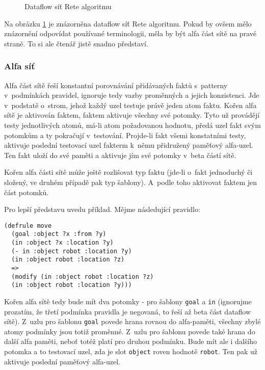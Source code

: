 \begin{figure}[h]
\centerline{}
\caption{Dataflow síť Rete algoritmu\cite{rete}}
\label{network}
\end{figure}

Na obrázku \ref{network} je znázorněna dataflow síť Rete algoritmu.
Pokud by ovšem mělo znázornění odpovídat používané terminologii, měla
by být alfa část sítě na pravé straně. To si ale čtenář jistě snadno
představí.
\subsubsection{Alfa síť}
Alfa část sítě řeší konstantní porovnávání přidávaných faktů s~patterny
v~podmínkách pravidel, ignoruje tedy vazby proměnných a jejich konzistenci.
Jde v~podstatě o~strom, jehož každý uzel testuje právě jeden atom faktu.
Kořen alfa sítě je aktivován faktem, faktem aktivuje všechny své potomky.
Tyto už provádějí testy jednotlivých atomů, má-li atom požadovanou hodnotu,
předá uzel fakt svým potomkům a ty pokračují v~testování. Projde-li fakt
všemi konstatními testy, aktivuje poslední testovací uzel fakterm k~němu
přidružený paměťový alfa-uzel. Ten fakt uloží do své paměti a aktivuje
jím své potomky v~beta částí sítě.

Kořen alfa části sítě může ještě rozlišovat typ faktu (jde-li o~fakt
jednoduchý či složený, ve druhém případě pak typ šablony). A~podle toho
aktivovat faktem jen část potomků.

Pro lepší představu uvedu příklad. Mějme následující pravidlo:
\begin{verbatim}
(defrule move
  (goal :object ?x :from ?y)
  (in :object ?x :location ?y)
  (- in :object robot :location ?y)
  (in :object robot :location ?z)
  =>
  (modify (in :object robot :location ?z)
  (in :object robot :location ?y)))
\end{verbatim}
Kořen alfa sítě tedy bude mít dva potomky - pro šablony \verb|goal|
a \verb|in| (ignorujme prozatím, že třetí podmínka pravidla je negovaná,
to řeší až beta část dataflow sítě). Z~uzlu pro šablonu \verb|goal|
povede hrana rovnou do alfa-paměti, všechny zbylé atomy podmínky jsou
totiž proměnné. Z~uzlu pro šablonu povede také hrana do další alfa
paměti, neboť totéž platí pro druhou podmínku. Bude mít ale i dalšího
potomka a to testovací uzel, zda je slot \verb|object| roven hodnotě
\verb|robot|. Ten pak už aktivuje poslední paměťový alfa-uzel.

